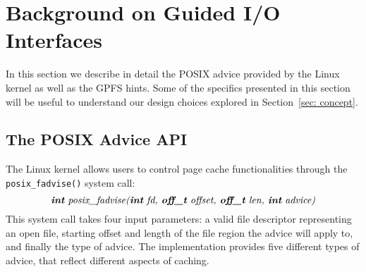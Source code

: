 \section{Background on Guided I/O Interfaces}
\label{sec: background}
In this section we describe in detail the POSIX advice provided by the Linux kernel as well as the GPFS hints. Some of the specifics presented in this section will be useful to understand our design choices explored in Section~\ref{sec: concept}.  

\subsection{The POSIX Advice API}
\label{subsec: posix_advice_api}
The Linux kernel allows users to control page cache functionalities through the \texttt{posix\_fadvise()} system call: $$\textit{\textbf{int} posix\_fadvise(\textbf{int} fd, \textbf{off\_t} offset, \textbf{off\_t} len, \textbf{int} advice)}$$ This system call takes four input parameters: a valid file descriptor representing an open file, starting offset and length of the file region the advice will apply to, and finally the type of advice. The implementation provides five different types of advice, that reflect different aspects of caching. 

\begin{table}[h]
    \caption{Values for \textit{advice} in the \textit{posix\_fadvise()} system call}
\centering
{}
\label{table: advice_table}
\end{table}  

